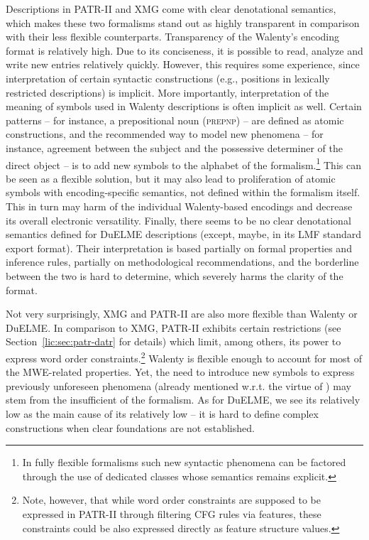 \documentclass[output=paper]{langsci/langscibook}
\begin{document}
Descriptions in PATR-II and XMG come with clear denotational semantics, which makes these two formalisms stand out as highly transparent in comparison with their less flexible counterparts. Transparency of the Walenty's encoding format is relatively high. Due to its conciseness, it is possible to read, analyze and write new entries relatively quickly. However, this requires some experience, since interpretation of certain syntactic constructions (e.g., positions in lexically restricted  descriptions) is implicit. More importantly, interpretation of the meaning of symbols used in Walenty descriptions is often implicit as well. Certain patterns -- for instance, a prepositional noun  (\textsc{prepnp}) -- are defined as atomic constructions, and the recommended way to model new phenomena -- for instance, agreement between the subject and the possessive determiner of the direct object -- is to add new symbols to the alphabet of the formalism.\footnote{In fully flexible formalisms such new syntactic phenomena can be factored through the use of dedicated classes whose semantics remains explicit.} This can be seen as a flexible solution, but it may also lead to proliferation of atomic symbols with encoding-specific semantics, not defined within the formalism itself. This in turn may harm  of the individual Walenty-based encodings and decrease its overall electronic versatility. Finally, there seems to be no clear denotational semantics defined for DuELME descriptions (except, maybe, in its LMF standard export format). Their interpretation is based partially on formal properties and inference rules, partially on methodological recommendations, and the borderline between the two is hard to determine, which severely harms the clarity of the format. 

Not very surprisingly, XMG and PATR-II are also more flexible than Walenty or DuELME. In comparison to XMG, PATR-II exhibits certain restrictions (see Section~\ref{lic:sec:patr-datr} for details) which limit, among others, its power to express word order constraints.\footnote{Note, however, that while word order constraints are supposed to be expressed in PATR-II through filtering CFG rules via features, these constraints could be also expressed directly as feature structure values.} Walenty is flexible enough to account for most of the MWE-related properties. Yet, the need to introduce new symbols to express previously unforeseen phenomena (already mentioned w.r.t. the virtue of ) may stem from the insufficient  of the formalism. As for DuELME, we see its relatively low  as the main cause of its relatively low  -- it is hard to define complex constructions when clear foundations are not established.
\end{document}
